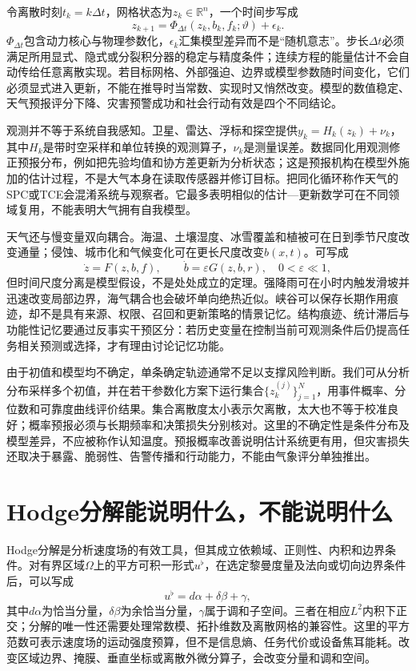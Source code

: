 令离散时刻$t_k=k\Delta t$，网格状态为$z_k\in\mathbb{R}^n$，一个时间步写成
\begin{equation}
    z_{k+1}=\Phi_{\Delta t}(z_k,b_k,f_k;\vartheta)+\epsilon_k.
\end{equation}
$\Phi_{\Delta t}$包含动力核心与物理参数化，$\epsilon_k$汇集模型差异而不是“随机意志”。步长$\Delta t$必须满足所用显式、隐式或分裂积分器的稳定与精度条件；连续方程的能量估计不会自动传给任意离散实现。若目标网格、外部强迫、边界或模型参数随时间变化，它们必须显式进入更新，不能在推导时当常数、实现时又悄然改变。模型的数值稳定、天气预报评分下降、灾害预警成功和社会行动有效是四个不同结论。

观测并不等于系统自我感知。卫星、雷达、浮标和探空提供$y_k=H_k(z_k)+\nu_k$，其中$H_k$是带时空采样和单位转换的观测算子，$\nu_k$是测量误差。数据同化用观测修正预报分布，例如把先验均值和协方差更新为分析状态；这是预报机构在模型外施加的估计过程，不是大气本身在读取传感器并修订目标。把同化循环称作天气的SPC或TCE会混淆系统与观察者。它最多表明相似的估计—更新数学可在不同领域复用，不能表明大气拥有自我模型。

天气还与慢变量双向耦合。海温、土壤湿度、冰雪覆盖和植被可在日到季节尺度改变通量；侵蚀、城市化和气候变化可在更长尺度改变$b(x,t)$。可写成
\begin{equation}
    \dot z=F(z,b,f),\qquad \dot b=\varepsilon G(z,b,r),\quad 0<\varepsilon\ll1,
\end{equation}
但时间尺度分离是模型假设，不是处处成立的定理。强降雨可在小时内触发滑坡并迅速改变局部边界，海气耦合也会破坏单向绝热近似。峡谷可以保存长期作用痕迹，却不是具有来源、权限、召回和更新策略的情景记忆。结构痕迹、统计滞后与功能性记忆要通过反事实干预区分：若历史变量在控制当前可观测条件后仍提高任务相关预测或选择，才有理由讨论记忆功能。

由于初值和模型均不确定，单条确定轨迹通常不足以支撑风险判断。我们可从分析分布采样多个初值，并在若干参数化方案下运行集合$\{z_k^{(j)}\}_{j=1}^N$，用事件概率、分位数和可靠度曲线评价结果。集合离散度太小表示欠离散，太大也不等于校准良好；概率预报必须与长期频率和决策损失分别核对。这里的不确定性是条件分布及模型差异，不应被称作认知温度。预报概率改善说明估计系统更有用，但灾害损失还取决于暴露、脆弱性、告警传播和行动能力，不能由气象评分单独推出。

\section{Hodge分解能说明什么，不能说明什么}
\label{sec:meteorological_phases_via_hodge}

Hodge分解是分析速度场的有效工具，但其成立依赖域、正则性、内积和边界条件。对有界区域$\Omega$上的平方可积一形式$u^\flat$，在选定黎曼度量及法向或切向边界条件后，可以写成
\begin{equation}
    u^\flat=d\alpha+\delta\beta+\gamma,
\end{equation}
其中$d\alpha$为恰当分量，$\delta\beta$为余恰当分量，$\gamma$属于调和子空间。三者在相应$L^2$内积下正交；分解的唯一性还需要处理常数模、拓扑维数及离散网格的兼容性。这里的平方范数可表示速度场的运动强度预算，但不是信息熵、任务代价或设备焦耳能耗。改变区域边界、掩膜、垂直坐标或离散外微分算子，会改变分量和调和空间。

